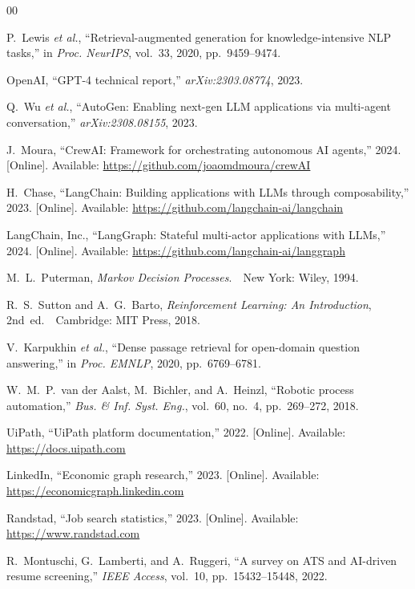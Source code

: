 \documentclass[conference]{IEEEtran}
\begin{document}
\begin{thebibliography}{00}

P.~Lewis \textit{et al.}, ``Retrieval-augmented generation for knowledge-intensive NLP tasks,'' in \textit{Proc. NeurIPS}, vol.~33, 2020, pp.~9459--9474.

OpenAI, ``GPT-4 technical report,'' \textit{arXiv:2303.08774}, 2023.

Q.~Wu \textit{et al.}, ``AutoGen: Enabling next-gen LLM applications via multi-agent conversation,'' \textit{arXiv:2308.08155}, 2023.

J.~Moura, ``CrewAI: Framework for orchestrating autonomous AI agents,'' 2024. [Online]. Available: \url{https://github.com/joaomdmoura/crewAI}

H.~Chase, ``LangChain: Building applications with LLMs through composability,'' 2023. [Online]. Available: \url{https://github.com/langchain-ai/langchain}

LangChain, Inc., ``LangGraph: Stateful multi-actor applications with LLMs,'' 2024. [Online]. Available: \url{https://github.com/langchain-ai/langgraph}

M.~L.~Puterman, \textit{Markov Decision Processes}.\ \ New York: Wiley, 1994.

R.~S.~Sutton and A.~G.~Barto, \textit{Reinforcement Learning: An Introduction}, 2nd~ed.\ \ Cambridge: MIT Press, 2018.

V.~Karpukhin \textit{et al.}, ``Dense passage retrieval for open-domain question answering,'' in \textit{Proc. EMNLP}, 2020, pp.~6769--6781.

W.~M.~P.~van der Aalst, M.~Bichler, and A.~Heinzl, ``Robotic process automation,'' \textit{Bus. \& Inf. Syst. Eng.}, vol.~60, no.~4, pp.~269--272, 2018.

UiPath, ``UiPath platform documentation,'' 2022. [Online]. Available: \url{https://docs.uipath.com}

LinkedIn, ``Economic graph research,'' 2023. [Online]. Available: \url{https://economicgraph.linkedin.com}

Randstad, ``Job search statistics,'' 2023. [Online]. Available: \url{https://www.randstad.com}

R.~Montuschi, G.~Lamberti, and A.~Ruggeri, ``A survey on ATS and AI-driven resume screening,'' \textit{IEEE Access}, vol.~10, pp.~15432--15448, 2022.


\end{thebibliography}
\end{document}
